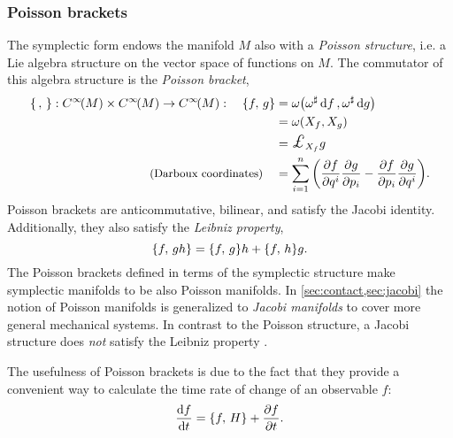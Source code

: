 \subsubsection{Poisson brackets}
The symplectic form endows the manifold \(M\) also with a \emph{Poisson structure}, i.e. a Lie algebra structure on the vector space of functions on \(M\). The commutator of this algebra structure is the \emph{Poisson bracket},
\begin{equation}
    \begin{split}
        \poisson{\,}{}: \functions{M} \times \functions{M} \to \functions{M}: \quad  
        \poisson{f}{g} &= \omega\qty(\fromDual{\omega}\dd{f}, \fromDual{\omega}\dd{g})  \\
                       &= \omega\qty(X_f, X_g) \\
                       &= \lied{X_f}{g} \\
        \text{\small (Darboux coordinates)} \quad &= \sum_{i = 1}^n \qty(\pdv{f}{q^i}\pdv{g}{p_i} - \pdv{f}{p_i}\pdv{g}{q^i}).
    \end{split}
\end{equation}
Poisson brackets are anticommutative, bilinear, and satisfy the Jacobi identity. Additionally, they also satisfy the \emph{Leibniz property}, 
\begin{equation}
     \qty{f,\,gh} = \qty{f,\,g} h + \qty{f,\,h} g.
\end{equation}
The Poisson brackets defined in terms of the symplectic structure make symplectic manifolds to be also Poisson manifolds. In \cref{sec:contact,sec:jacobi} the notion of Poisson manifolds is generalized to \emph{Jacobi manifolds} to cover more general mechanical systems. In contrast to the Poisson structure, a Jacobi structure does \emph{not} satisfy the Leibniz property \cite{Arnold1989,Libermann1987}.

The usefulness of Poisson brackets is due to the fact that they provide a convenient way to calculate the time rate of change of an observable \(f\): 
\begin{equation}
     \dv{f}{t} = \qty{f,\,H} + \pdv{f}{t}.
\end{equation}


